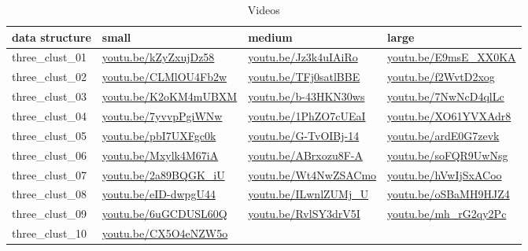 \documentclass[
  11pt,
  a4paper,
]{report}
\begin{document}
\begin{longtable}[]{@{}llll@{}}

\caption{\label{tbl-links-html}Videos}

\tabularnewline

\toprule\noalign{}
data structure & small & medium & large \\
\midrule\noalign{}
\endhead
\bottomrule\noalign{}
\endlastfoot
three\_clust\_01 &
\href{https://youtu.be/kZyZxujDz58}{youtu.be/kZyZxujDz58} &
\href{https://youtu.be/Jz3k4uIAiRo}{youtu.be/Jz3k4uIAiRo} &
\href{https://youtu.be/E9msE_XX0KA}{youtu.be/E9msE\_XX0KA} \\
three\_clust\_02 &
\href{https://youtu.be/CLMlOU4Fb2w}{youtu.be/CLMlOU4Fb2w} &
\href{https://youtu.be/TFj0satlBBE}{youtu.be/TFj0satlBBE} &
\href{https://youtu.be/_f2WvtD2xog}{youtu.be/f2WvtD2xog} \\
three\_clust\_03 &
\href{https://youtu.be/K2oKM4mUBXM}{youtu.be/K2oKM4mUBXM} &
\href{https://youtu.be/b-43HKN30ws}{youtu.be/b-43HKN30ws} &
\href{https://youtu.be/7NwNcD4qlLc}{youtu.be/7NwNcD4qlLc} \\
three\_clust\_04 &
\href{https://youtu.be/7yvvpPgiWNw}{youtu.be/7yvvpPgiWNw} &
\href{https://youtu.be/1PhZO7cUEaI}{youtu.be/1PhZO7cUEaI} &
\href{https://youtu.be/XO61YVXAdr8}{youtu.be/XO61YVXAdr8} \\
three\_clust\_05 &
\href{https://youtu.be/pbI7UXFgc0k}{youtu.be/pbI7UXFgc0k} &
\href{https://youtu.be/G-TvOIBj-14}{youtu.be/G-TvOIBj-14} &
\href{https://youtu.be/ardE0G7zevk}{youtu.be/ardE0G7zevk} \\
three\_clust\_06 &
\href{https://youtu.be/Mxylk4M67iA}{youtu.be/Mxylk4M67iA} &
\href{https://youtu.be/ABrxozu8F-A}{youtu.be/ABrxozu8F-A} &
\href{https://youtu.be/soFQR9UwNsg}{youtu.be/soFQR9UwNsg} \\
three\_clust\_07 &
\href{https://youtu.be/2a89BQGK_iU}{youtu.be/2a89BQGK\_iU} &
\href{https://youtu.be/Wt4NwZSACmo}{youtu.be/Wt4NwZSACmo} &
\href{https://youtu.be/hVwIjSxACoo}{youtu.be/hVwIjSxACoo} \\
three\_clust\_08 &
\href{https://youtu.be/eID-dwpgU44}{youtu.be/eID-dwpgU44} &
\href{https://youtu.be/ILwnlZUMj_U}{youtu.be/ILwnlZUMj\_U} &
\href{https://youtu.be/oSBaMH9HJZ4}{youtu.be/oSBaMH9HJZ4} \\
three\_clust\_09 &
\href{https://youtu.be/6uGCDUSL60Q}{youtu.be/6uGCDUSL60Q} &
\href{https://youtu.be/RvlSY3drV5I}{youtu.be/RvlSY3drV5I} &
\href{https://youtu.be/mh_rG2qy2Pc}{youtu.be/mh\_rG2qy2Pc} \\
three\_clust\_10 &
\href{https://youtu.be/CX5O4eNZW5o}{youtu.be/CX5O4eNZW5o} &

\end{longtable}
\end{document}
